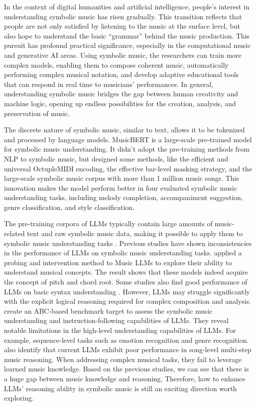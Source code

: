 \documentclass[sigconf]{acmart}
\begin{document}
In the context of digital humanities and artificial intelligence, people's interest in understanding symbolic music has risen gradually. This transition reflects that people are not only satisfied by listening to the music at the surface level, but also hope to understand the basic ``grammar'' behind the music production. This pursuit has profound practical significance, especially in the computational music and generative AI areas. Using symbolic music, the researchers can train more complex models, enabling them to compose coherent music, automatically performing complex musical notation, and develop adaptive educational tools that can respond in real time to musicians' performances. In general, understanding symbolic music bridges the gap between human creativity and machine logic, opening up endless possibilities for the creation, analysis, and preservation of music.

The discrete nature of symbolic music, similar to text, allows it to be tokenized and processed by language models. MusicBERT \citep{zengMusicBERTSymbolicMusic2021} is a large-scale pre-trained model for symbolic music understanding. It didn't adopt the pre-training methods from NLP to symbolic music, but designed some methods, like the efficient and universal OctupleMIDI encoding, the effective bar-level masking strategy, and the large-scale symbolic music corpus with more than 1 million music songs. This innovation makes the model perform better in four evaluated symbolic music understanding tasks, including melody completion, accompaniment suggestion, genre classification, and style classification. 

The pre-training corpora of LLMs typically contain large amounts of music-related text and raw symbolic music data, making it possible to apply them to symbolic music understanding tasks \citep{zhouCanLLMsReason2024a}. Previous studies have shown inconsistencies in the performance of LLMs on symbolic music understanding tasks. \citet{maMusicLLMsLearn2024} applied a probing and intervention method to Music LLMs to explore their ability to understand musical concepts. The result shows that these models indeed acquire the concept of pitch and chord root. Some studies also find good performance of LLMs on basic syntax understanding \citep{shinLargeLanguageModels2025}\citep{yuanChatMusicianUnderstandingGenerating2024a}. However, LLMs may struggle significantly with the explicit logical reasoning required for complex composition and analysis. \citet{zhaoABCEvalBenchmarkingLarge2025} create an ABC-based benchmark target to assess the symbolic music understanding and instruction-following capabilities of LLMs. They reveal notable limitations in the high-level understanding capabilities of LLMs. For example, sequence-level tasks such as emotion recognition and genre recognition. \citet{zhouCanLLMsReason2024a} also identify that current LLMs exhibit poor performance in song-level multi-step music reasoning. When addressing complex musical tasks, they fail to leverage learned music knowledge. Based on the previous studies, we can see that there is a huge gap between music knowledge and reasoning. Therefore, how to enhance LLMs' reasoning ability in symbolic music is still an exciting direction worth exploring.
\end{document}
